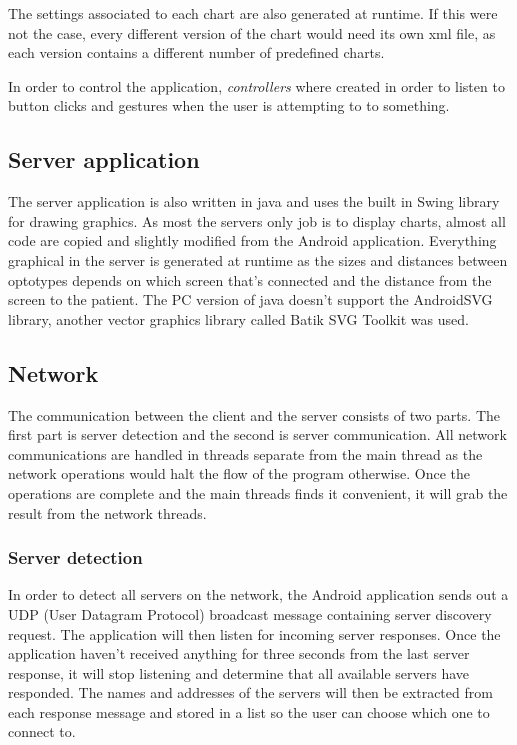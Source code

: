 \documentclass[12pt,a4paper,notitlepage]{report}
\begin{document}
The settings associated to each chart are also generated at runtime. If this were not the case, every different version of the chart would need its own xml file, as each version contains a different number of predefined charts.

In order to control the application, \textit{controllers} where created in order to listen to button clicks and gestures when the user is attempting to to something.

\subsection{Server application}
The server application is also written in java and uses the built in Swing library for drawing graphics. As most the servers only job is to display charts, almost all code are copied and slightly modified from the Android application. Everything graphical in the server is generated at runtime as the sizes and distances between optotypes depends on which screen that's connected and the distance from the screen to the patient. The PC version of java doesn't support the AndroidSVG library, another vector graphics library called Batik SVG Toolkit \cite{Batik} was used.

\subsection{Network}
The communication between the client and the server consists of two parts. The first part is server detection and the second is server communication. All network communications are handled in threads separate from the main thread as the network operations would halt the flow of the program otherwise. Once the operations are complete and the main threads finds it convenient, it will grab the result from the network threads.

\subsubsection{Server detection}
In order to detect all servers on the network, the Android application sends out a UDP (User Datagram Protocol) broadcast message containing server discovery request. The application will then listen for incoming server responses. Once the application haven't received anything for three seconds from the last server response, it will stop listening and determine that all available servers have responded. The names and addresses of the servers will then be extracted from each response message and stored in a list so the user can choose which one to connect to.
\end{document}
